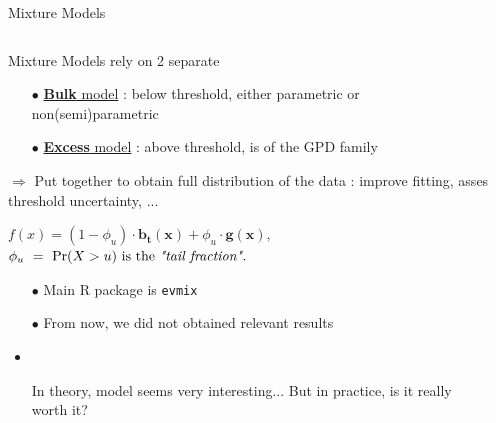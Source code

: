 \documentclass[9pt,xcolor={dvipsnames}]{beamer}
\begin{document}
\begin{frame}
\begin{columns}[T]
\begin{column}{.4\textwidth}
\vspace{-1.5cm} \hspace{-.6cm}
	\end{column}
\vspace{-1.5cm}
	\end{columns}
\end{frame}

\begin{frame}{Mixture Models} 
	
	\begin{columns}[T]
		\begin{column}{.5\textwidth}
		
	\begin{block}{Mixture Models rely on 2 separate}
	\begin{itemize}
		\item[$\bullet$] \underline{\textbf{Bulk} model} : \small  below threshold, either parametric or non(semi)parametric
	\normalsize	\item[$\bullet$]\underline{\textbf{Excess} model} : \small above threshold, is of the GPD family
	\end{itemize}
	
	\end{block}
	\vspace{-.15cm}
$\Rightarrow$ Put together to obtain full distribution of the data : improve fitting, asses threshold uncertainty, ...
		\vspace{2.5mm}
	
		$\boxed{  
		 f(x)=(1-\phi_u)\cdot \boldsymbol{b_t(x)}+\phi_u\cdot \boldsymbol{g(x)},}$ \\ \vspace{.05cm}
	\scriptsize	$\phi_u\ =\ \text{Pr}(X>u) \ \text{is the \emph{"tail fraction".}}$
	\normalsize
	\vspace{.2cm}
	 \begin{itemize}
	 	\item[$\bullet$] Main R package is \texttt{evmix}
	 	\item[$\bullet$] From now, we did not obtained relevant results
	 			\vspace{-.1cm}
	\small   \item\item[{\fontfamily{cyklop}\fontsize{6}{6}\selectfont \boxed{\textit{?}}}] In theory, model seems very interesting... But in practice, is it really worth it?
	 \end{itemize}
	 		\end{column}
	 		\hspace{2pt} \hspace{2pt}
	 \begin{column}{.55\textwidth}
	 	


\end{column}
\end{columns}
\end{frame}
\end{document}

